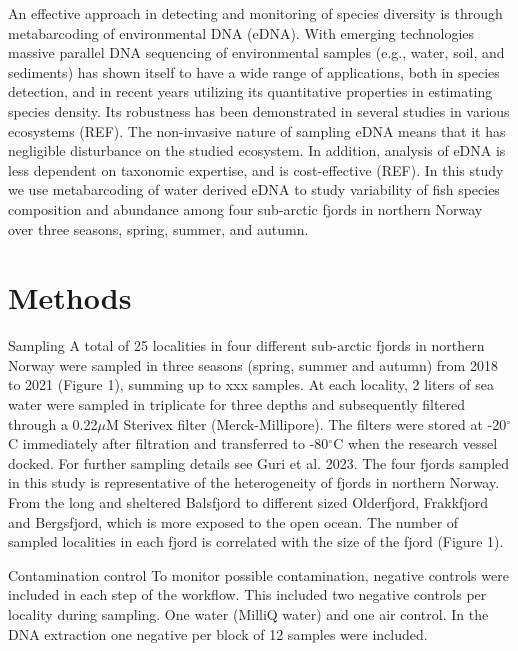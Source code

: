 \documentclass[12pt]{article}
\begin{document}
An effective approach in detecting and monitoring of species diversity is through metabarcoding of environmental DNA (eDNA). With emerging technologies massive parallel DNA sequencing of environmental samples (e.g., water, soil, and sediments) has shown itself to have a wide range of applications, both in species detection, and in recent years utilizing its quantitative properties in estimating species density. Its robustness has been demonstrated in several studies in various ecosystems (REF). The non-invasive nature of sampling eDNA means that it has negligible disturbance on the studied ecosystem. In addition, analysis of eDNA is less dependent on taxonomic expertise, and is cost-effective (REF).
In this study we use metabarcoding of water derived eDNA to study variability of fish species composition and abundance among four sub-arctic fjords in northern Norway over three seasons, spring, summer, and autumn. 


\section{Methods}
\label{sec:meth}
Sampling
A total of 25 localities in four different sub-arctic fjords in northern Norway were sampled in three seasons (spring, summer and autumn) from 2018 to 2021 (Figure 1), summing up to xxx samples. At each locality, 2 liters of sea water were sampled in triplicate for three depths and subsequently filtered through a 0.22$\mu$M Sterivex filter (Merck-Millipore). The filters were stored at -20$^\circ$C immediately after filtration and transferred to -80$^\circ$C when the research vessel docked. For further sampling details see Guri et al. 2023. The four fjords sampled in this study is representative of the heterogeneity of fjords in northern Norway. From the long and sheltered Balsfjord to different sized Olderfjord, Frakkfjord and Bergsfjord, which is more exposed to the open ocean. The number of sampled localities in each fjord is correlated with the size of the fjord (Figure 1).


Contamination control
To monitor possible contamination, negative controls were included in each step of the workflow. This included two negative controls per locality during sampling. One water (MilliQ water) and one air control. In the DNA extraction one negative per block of 12 samples were included.
\end{document}
